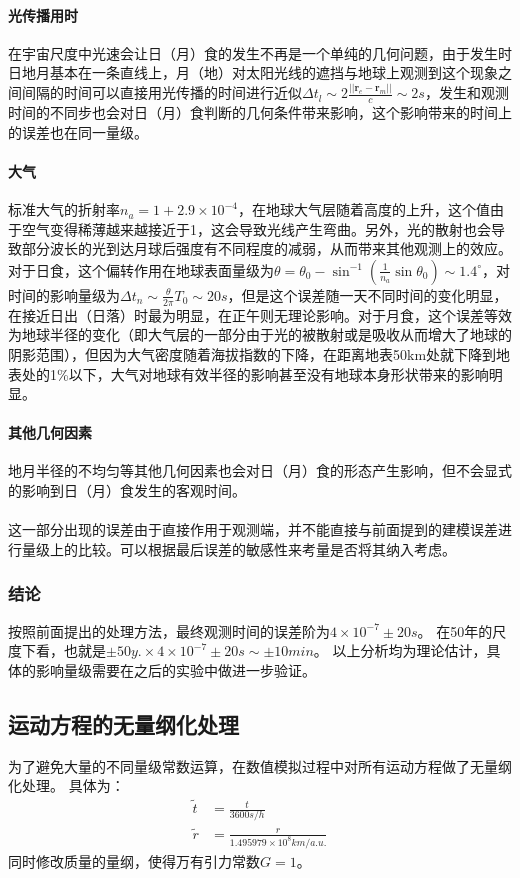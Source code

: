 \documentclass[hidelinks]{article}
\begin{document}
\paragraph{光传播用时}
在宇宙尺度中光速会让日（月）食的发生不再是一个单纯的几何问题，由于发生时日地月基本在一条直线上，月（地）对太阳光线的遮挡与地球上观测到这个现象之间间隔的时间可以直接用光传播的时间进行近似$\Delta t_l\sim2\frac{||\mathbf{r}_e-\mathbf{r}_m||}{c}\sim2s$，发生和观测时间的不同步也会对日（月）食判断的几何条件带来影响，这个影响带来的时间上的误差也在同一量级。
\paragraph{大气}
标准大气的折射率$n_a=1+2.9\times10^{-4}$，在地球大气层随着高度的上升，这个值由于空气变得稀薄越来越接近于1，这会导致光线产生弯曲。另外，光的散射也会导致部分波长的光到达月球后强度有不同程度的减弱，从而带来其他观测上的效应。对于日食，这个偏转作用在地球表面量级为$\theta=\theta_0-\sin^{-1}(\frac{1}{n_a}\sin\theta_0)\sim1.4^\circ$，对时间的影响量级为$\Delta t_n\sim\frac{\theta}{2\pi}T_0\sim20s$，但是这个误差随一天不同时间的变化明显，在接近日出（日落）时最为明显，在正午则无理论影响。对于月食，这个误差等效为地球半径的变化（即大气层的一部分由于光的被散射或是吸收从而增大了地球的阴影范围），但因为大气密度随着海拔指数的下降，在距离地表50km处就下降到地表处的1\%以下，大气对地球有效半径的影响甚至没有地球本身形状带来的影响明显。
\paragraph{其他几何因素}
地月半径的不均匀等其他几何因素也会对日（月）食的形态产生影响，但不会显式的影响到日（月）食发生的客观时间。
\\
\\
这一部分出现的误差由于直接作用于观测端，并不能直接与前面提到的建模误差进行量级上的比较。可以根据最后误差的敏感性来考量是否将其纳入考虑。
\subsubsection{结论}
按照前面提出的处理方法，最终观测时间的误差阶为$4\times10^{-7}\pm20s$。
在50年的尺度下看，也就是$\pm50 y.\times 4\times10^{-7}\pm20 s\sim \pm10min$。
以上分析均为理论估计，具体的影响量级需要在之后的实验中做进一步验证。
\subsection{运动方程的无量纲化处理}
为了避免大量的不同量级常数运算，在数值模拟过程中对所有运动方程做了无量纲化处理。
具体为：
\begin{align*}
    \tilde{t}&=\frac{t}{3600s/h}\\
    \tilde{r}&=\frac{r}{1.495979\times10^8km/a.u.}
\end{align*}
同时修改质量的量纲，使得万有引力常数$G=1$。
\end{document}
